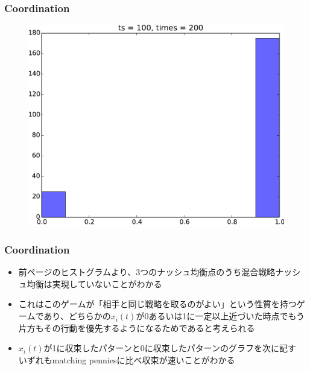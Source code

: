\documentclass[dvipdfmx,fleqn,handout]{beamer}
\begin{document}
\begin{frame}
\frametitle{Coordination}
\begin{figure}
 \centering
 \includegraphics[width=\linewidth]{coordhist.pdf}
 \label{fig:coordination_hist}
\end{figure}
\end{frame}


\begin{frame}
\frametitle{Coordination}
\begin{itemize}\setlength{\parskip}{0.5em}
\item
前ページのヒストグラムより、3つのナッシュ均衡点のうち混合戦略ナッシュ均衡は実現していないことがわかる\pause
\item
これはこのゲームが「相手と同じ戦略を取るのがよい」という性質を持つゲームであり、どちらかの$x_i(t)$が0あるいは1に一定以上近づいた時点でもう片方もその行動を優先するようになるためであると考えられる\pause
\item
$x_i(t)$が1に収束したパターンと0に収束したパターンのグラフを次に記す\pause\\
いずれもmatching penniesに比べ収束が速いことがわかる
\end{itemize}
\end{frame}
\end{document}
